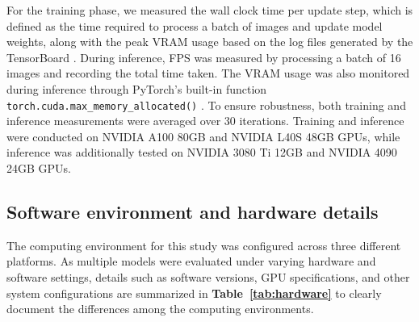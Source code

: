 For the training phase, we measured the wall clock time per update step, which is defined as the time required to process a batch of images and update model weights, along with the peak VRAM usage based on the log files generated by the TensorBoard \citep{martin_abadi_tensorflow_2015}. During inference, FPS was measured by processing a batch of 16 images and recording the total time taken. The VRAM usage was also monitored during inference through PyTorch's built-in function \texttt{torch.cuda.max\_memory\_allocated()} \citep{paszke_pytorch_2019}. To ensure robustness, both training and inference measurements were averaged over 30 iterations. Training and inference were conducted on NVIDIA A100 80GB and NVIDIA L40S 48GB GPUs, while inference was additionally tested on NVIDIA 3080 Ti 12GB and NVIDIA 4090 24GB GPUs.

\subsection*{Software environment and hardware details}
The computing environment for this study was configured across three different platforms. As multiple models were evaluated under varying hardware and software settings, details such as software versions, GPU specifications, and other system configurations are summarized in \textbf{Table~\ref{tab:hardware}} to clearly document the differences among the computing environments.

